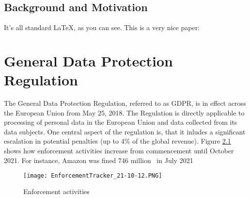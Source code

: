 \documentclass[a4paper,12pt]{report}
\begin{document}
		\section{Background and Motivation}
		\startsection
			It's all standard \LaTeX, as you can see. This is a very nice paper:
			\nocite{*}
		\closesection
		
	\chapter{General Data Protection Regulation}
	The General Data Protection Regulation, referred to as GDPR, is in effect across the European Union from May 25, 2018.
	The Regulation is directly applicable to processing of personal data in the European Union and data collected from its data subjects.
	One central aspect of the regulation is, that it inludes a significant escalation in potential penalties (up to 4\% of the global revenue).
	Figure \ref{fig:enforcement_tracker} shows how enforcement activities increase from commencement until October 2021.
	For instance, Amazon was fined 746 million \texteuro \ in July 2021 \cite{EnforcementTracker}
	\begin{figure}
		\texttt{[image: EnforcementTracker\_21-10-12.PNG]}
		\caption{Enforcement activities \cite{EnforcementTracker}}
		\label{fig:enforcement_tracker}
	\end{figure}
	
\end{document}
